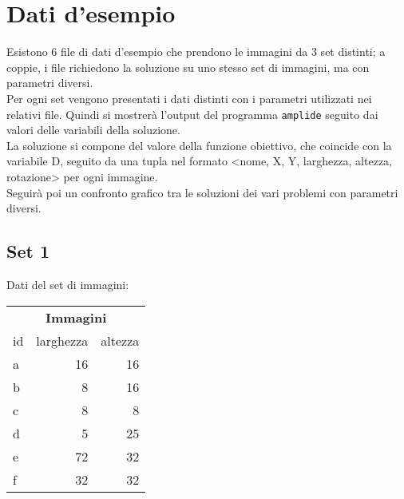 
\section{Dati d'esempio}

	Esistono 6 file di dati d'esempio che prendono le immagini da 3 set distinti; a coppie, i file richiedono la soluzione su uno stesso set di immagini, ma con parametri diversi. \\
	Per ogni set vengono presentati i dati distinti con i parametri utilizzati nei relativi file. Quindi si mostrerà l'output del programma \texttt{amplide} seguito dai valori delle variabili della soluzione. \\
	La soluzione si compone del valore della funzione obiettivo, che coincide con la variabile D, seguito da una tupla nel formato <nome, X, Y, larghezza, altezza, rotazione> per ogni immagine. \\
	Seguirà poi un confronto grafico tra le soluzioni dei vari problemi con parametri diversi.



	\subsection{Set 1}
\iffalse
	Nel set sono presenti 6 immagini:
	\begin{itemize}
		\itemsep0em
		\item \texttt{a:\ 16x16};
		\item \texttt{b:\ \ 8x16};
		\item \texttt{c:\ \ 8x\ 8};
		\item \texttt{d:\ \ 5x25};
		\item \texttt{e:\ 72x32};
		\item \texttt{f:\ 32x32};
	\end{itemize}
\fi
%
Dati del set di immagini:  \\
%

\begin{table}[h!]
\centering
\footnotesize
\begin{tabular}{l|r|r}
\multicolumn{3}{c}{\textbf{Immagini}} \\ 
id & larghezza & altezza \\
\hline
a & 16 & 16 \\
		 b & 8&16\\
		 c & 8& 8\\
		 d & 5&25\\
		 e & 72&32\\
		 f & 32 &32\\
\end{tabular}
\end{table}
%



